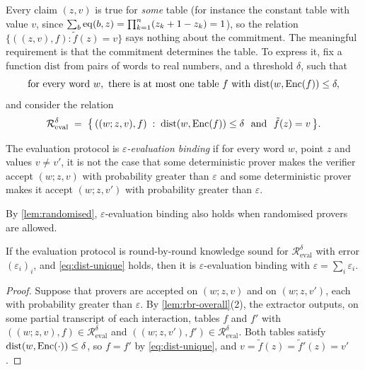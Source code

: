 Every claim $(z,v)$ is true for \emph{some} table (for instance the constant table with value $v$, since $\sum_b \mathrm{eq}(b,z) = \prod_{k=1}^n (z_k + 1 - z_k) = 1$), so the relation $\{((z,v), f) : \tilde f(z) = v\}$ says nothing about the commitment.
The meaningful requirement is that the commitment determines the table.
To express it, fix a function $\mathrm{dist}$ from pairs of words to real numbers, and a threshold $\delta$, such that
\begin{equation}\label{eq:dist-unique}
  \text{for every word } w, \text{ there is at most one table } f \text{ with } \mathrm{dist}(w, \mathrm{Enc}(f)) \le \delta,
\end{equation}
and consider the relation
\[
  \mathcal{R}^{\delta}_{\mathrm{eval}} \;=\; \bigl\{\, ((w; z,v), f) \;:\; \mathrm{dist}(w, \Enc(f)) \le \delta \ \text{ and } \ \tilde f(z) = v \,\bigr\}.
\]

\begin{definition}\label{def:binding}
The evaluation protocol is \emph{$\varepsilon$-evaluation binding} if for every word $w$, point $z$ and values $v \ne v'$, it is not the case that some deterministic prover makes the verifier accept $(w; z, v)$ with probability greater than $\varepsilon$ and some deterministic prover makes it accept $(w; z, v')$ with probability greater than $\varepsilon$.
\end{definition}

By \cref{lem:randomised}, $\varepsilon$-evaluation binding also holds when randomised provers are allowed.

\begin{lemma}\label{lem:rbr-binding}
If the evaluation protocol is round-by-round knowledge sound for $\mathcal{R}^{\delta}_{\mathrm{eval}}$ with error $(\varepsilon_i)_i$, and \eqref{eq:dist-unique} holds, then it is $\varepsilon$-evaluation binding with $\varepsilon = \sum_i \varepsilon_i$.
\end{lemma}

\begin{proof}
Suppose that provers are accepted on $(w; z,v)$ and on $(w;z,v')$, each with probability greater than $\varepsilon$.
By \cref{lem:rbr-overall}(2), the extractor outputs, on some partial transcript of each interaction, tables $f$ and $f'$ with $((w;z,v),f) \in \mathcal{R}^{\delta}_{\mathrm{eval}}$ and $((w;z,v'),f') \in \mathcal{R}^{\delta}_{\mathrm{eval}}$.
Both tables satisfy $\mathrm{dist}(w, \mathrm{Enc}(\cdot)) \le \delta$, so $f = f'$ by \eqref{eq:dist-unique}, and $v = \tilde f(z) = \tilde f'(z) = v'$.
\end{proof}

